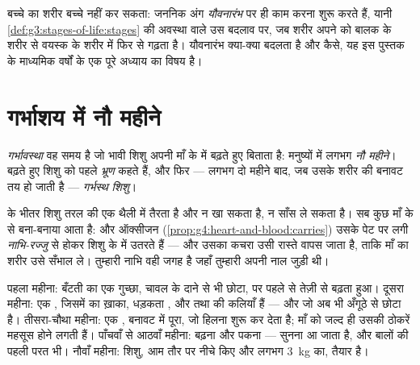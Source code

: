 \begin{remark}\label{rem:g5:human-reproduction:adults}
बच्चे का शरीर बच्चे नहीं कर सकता: जननिक अंग \emph{यौवनारंभ} पर ही काम
करना शुरू करते हैं, यानी \cref{def:g3:stages-of-life:stages} की 
अवस्था वाले उस बदलाव पर, जब शरीर अपने को बालक के शरीर से वयस्क के शरीर
में फिर से गढ़ता है। यौवनारंभ क्या-क्या बदलता है और कैसे, यह इस पुस्तक
के माध्यमिक वर्षों के एक पूरे अध्याय का विषय है।
\end{remark}

\section{गर्भाशय में नौ महीने}

\begin{definition}[गर्भावस्था]\label{def:g5:human-reproduction:pregnancy}
\emph{गर्भावस्था} वह समय है जो भावी शिशु अपनी माँ के
 में बढ़ते हुए बिताता है: मनुष्यों में लगभग \emph{नौ महीने}।
बढ़ते हुए शिशु को पहले \emph{भ्रूण} कहते हैं, और फिर ---
लगभग दो महीने बाद, जब उसके शरीर की बनावट तय हो जाती है ---
\emph{गर्भस्थ शिशु}।
\end{definition}

\begin{proposition}[नाल के ज़रिए पोषण]\label{prop:g5:human-reproduction:cord}
 के भीतर शिशु तरल की एक थैली में तैरता है और न खा सकता है, न
साँस ले सकता है। सब कुछ माँ के  से बना-बनाया आता है:  और
ऑक्सीजन (\cref{prop:g4:heart-and-blood:carries}) उसके पेट पर लगी
\emph{नाभि-रज्जु} से होकर शिशु के  में उतरते हैं
--- और उसका कचरा उसी रास्ते वापस जाता है, ताकि माँ का शरीर उसे सँभाल
ले। तुम्हारी नाभि वही जगह है जहाँ तुम्हारी अपनी नाल जुड़ी थी।
\end{proposition}
\admitted

\begin{example}[नौ महीने का समय-पत्रक]\label{ex:g5:human-reproduction:timetable}
पहला महीना: बँटती  का एक गुच्छा, चावल के दाने से भी छोटा, पर
पहले से तेज़ी से बढ़ता हुआ। दूसरा महीना: एक , जिसमें  का ख़ाका,
धड़कता , और  तथा  की कलियाँ हैं --- और जो अब भी अँगूठे
से छोटा है। तीसरा-चौथा महीना: एक , बनावट में पूरा, जो हिलना
शुरू कर देता है; माँ को जल्द ही उसकी ठोकरें महसूस होने लगती हैं।
पाँचवाँ से आठवाँ महीना: बढ़ना और पकना --- सुनना आ जाता है, और बालों की
पहली परत भी। नौवाँ महीना: शिशु, आम तौर पर  नीचे किए और लगभग
\qty{3}{kg} का, तैयार है।
\end{example}

